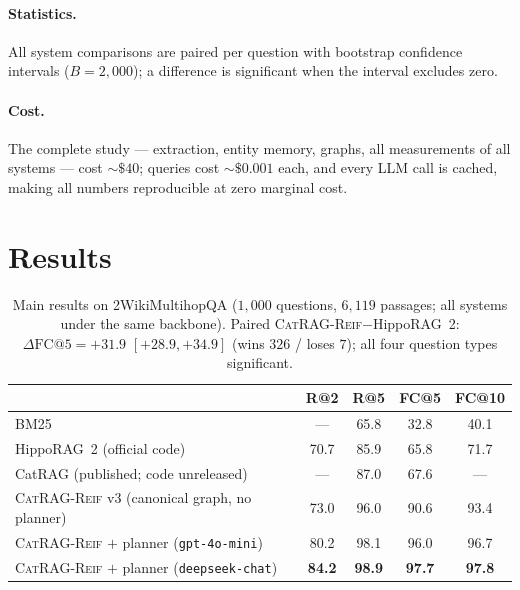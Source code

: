 \documentclass[11pt,a4paper]{article}
\newcommand{\sys}{\textsc{CatRAG-Reif}}
\newcommand{\hippo}{HippoRAG~2}
\begin{document}
\paragraph{Statistics.} All system comparisons are paired per question with
bootstrap confidence intervals ($B{=}2{,}000$); a difference is significant
when the interval excludes zero. \paragraph{Cost.} The complete study ---
extraction, entity memory, graphs, all measurements of all systems ---
cost ${\sim}\$40$; queries cost ${\sim}\$0.001$ each, and every LLM call is
cached, making all numbers reproducible at zero marginal cost.

\section{Results}
\label{sec:results}

\begin{table}[t]
\centering\small
\caption{Main results on 2WikiMultihopQA ($1{,}000$ questions, $6{,}119$
passages; all systems under the same backbone). Paired
\sys{}$-$\hippo{}: $\Delta\mathrm{FC@}5=+31.9$ $[+28.9,+34.9]$ (wins
$326$ / loses $7$); all four question types significant.}
\label{tab:main}
\begin{tabular}{lcccc}
\toprule
 & R@2 & R@5 & FC@5 & FC@10\\
\midrule
BM25 & --- & 65.8 & 32.8 & 40.1\\
\hippo{} (official code) & 70.7 & 85.9 & 65.8 & 71.7\\
CatRAG (published; code unreleased) & --- & 87.0 & 67.6 & ---\\
\sys{} v3 (canonical graph, no planner) & 73.0 & 96.0 & 90.6 & 93.4\\
\sys{} $+$ planner (\texttt{gpt-4o-mini}) & 80.2 & 98.1 & 96.0 & 96.7\\
\sys{} $+$ planner (\texttt{deepseek-chat}) & \textbf{84.2} & \textbf{98.9} & \textbf{97.7} & \textbf{97.8}\\
\bottomrule
\end{tabular}
\end{table}
\end{document}
